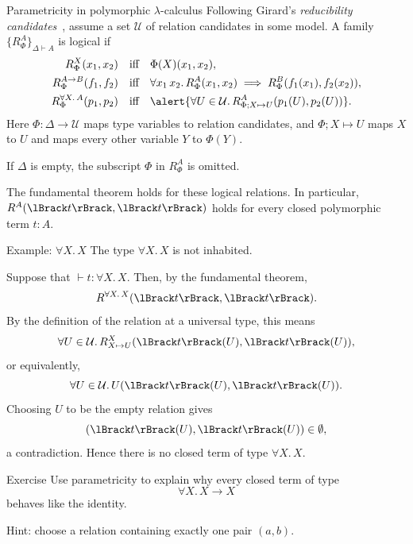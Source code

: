 \begin{frame}{Parametricity in polymorphic $\lambda$-calculus}
  Following Girard's \emph{reducibility candidates}~\cite{Girard1989}, assume a
  set $\mathcal{U}$ of \alert{relation candidates} in some model.
  A family $\{R_{\Phi}^{A}\}_{\Delta \vdash A}$ is logical if
  \begin{align*}
    R^{X}_{\Phi}(x_1,x_2)
      & \quad\text{iff}\quad \Phi(X)(x_1,x_2), \\
    R^{A \to B}_{\Phi}(f_1,f_2)
      & \quad\text{iff}\quad
      \forall x_1\,x_2.\,
        R^{A}_{\Phi}(x_1,x_2) \implies
        R^{B}_{\Phi}(f_1(x_1),f_2(x_2)), \\
    R^{\forall X.\,A}_{\Phi}(p_1,p_2)
      & \quad\text{iff}\quad
      \alert{\forall U \in \mathcal{U}.\,
        R^{A}_{\Phi; X \mapsto U}(p_1(U),p_2(U))}.
  \end{align*}
  Here $\Phi\colon \Delta \to \mathcal{U}$ maps type variables to relation
  candidates, and $\Phi;X \mapsto U$ maps $X$ to $U$ and maps every other
  variable $Y$ to $\Phi(Y)$.

  If $\Delta$ is empty, the subscript $\Phi$ in $R^A_{\Phi}$ is omitted.
  \begin{theorem}
    The fundamental theorem holds for these logical relations.  In particular,
    $R^A(\Brackets{t},\Brackets{t})$ holds for every closed polymorphic term
    $t : A$.
  \end{theorem}
\end{frame}

\begin{frame}{Example: $\forall X.\,X$}
  The type $\forall X.\,X$ is not inhabited.

  Suppose that $\vdash t : \forall X.\,X$.
  Then, by the fundamental theorem,
  \[
    R^{\forall X.\,X}(\Brackets{t},\Brackets{t}).
  \]
  By the definition of the relation at a universal type, this means
  \[
    \forall U \in \mathcal{U}.\,
      R^X_{X \mapsto U}(\Brackets{t}(U),\Brackets{t}(U)),
  \]
  or equivalently,
  \[
    \forall U \in \mathcal{U}.\,
      U(\Brackets{t}(U),\Brackets{t}(U)).
  \]
  Choosing $U$ to be the empty relation gives
  \[
    (\Brackets{t}(U),\Brackets{t}(U)) \in \emptyset,
  \]
  a contradiction.  Hence there is no closed term of type $\forall X.\,X$.
\end{frame}

\begin{frame}{Exercise}
  Use parametricity to explain why every closed term of type
  \[
    \forall X.\,X \to X
  \]
  behaves like the identity.

  Hint: choose a relation containing exactly one pair \((a,b)\).
  
\end{frame}

